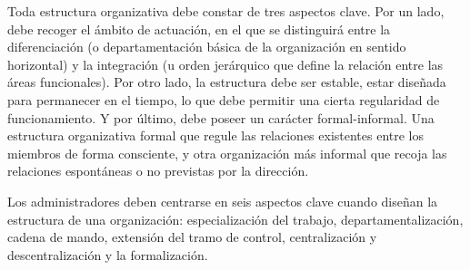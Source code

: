 \documentclass[
]{krantz}
\begin{document}
Toda estructura organizativa debe constar de tres aspectos clave. Por un lado, debe recoger el ámbito de actuación, en el que se distinguirá entre la diferenciación (o departamentación básica de la organización en sentido horizontal) y la integración (u orden jerárquico que define la relación entre las áreas funcionales). Por otro lado, la estructura debe ser estable, estar diseñada para permanecer en el tiempo, lo que debe permitir una cierta regularidad de funcionamiento. Y por último, debe poseer un carácter formal-informal. Una estructura organizativa formal que regule las relaciones existentes entre los miembros de forma consciente, y otra organización más informal que recoja las relaciones espontáneas o no previstas por la dirección.

Los administradores deben centrarse en seis aspectos clave cuando diseñan la estructura de una organización: especialización del trabajo, departamentalización, cadena de mando, extensión del tramo de control, centralización y descentralización y la formalización.
\end{document}
